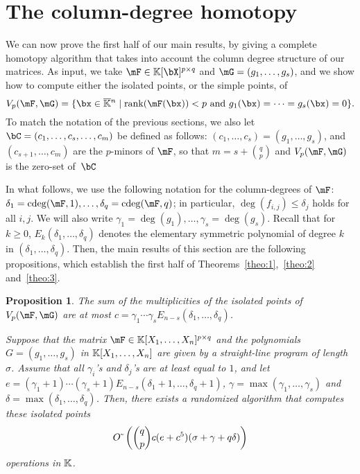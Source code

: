 \documentclass[12pt]{article}
\newtheorem{proposition}[definition]{Proposition}
\begin{document}
\section{The column-degree homotopy}\label{sec:columndegree}

We can now prove the first half of our main results, by giving a
complete homotopy algorithm that takes into account the column degree
structure of our matrices. As input, we take $\mF \in \K[\bX]^{p\times q}$ and $\mG=(g_1,\dots,g_s)$,
and we show how to compute either the isolated points, or
the simple points, of
$$\VpFG{p}{\mF}{\mG} = \{\bx \in \KKbar{}^n \mid
\mathrm{rank}(\mF({\bx})) < p \text{~and~}
g_1(\bx)=\cdots=g_s(\bx)=0\}.$$ 
To match the notation of the previous sections, we also let
$\bC=(c_1,\dots,c_{s},\dots,c_m)$ be defined as follows:
$(c_1,\dots,c_{s})=(g_1,\dots,g_s)$, and $(c_{s+1},\dots,c_{m})$ are
the $p$-minors of $\mF$, so that $m=s+{q \choose p}$ and
$\VpFG{p}{\mF}{\mG}$ is the zero-set of~$\bC$


In what follows, we use the following notation for the column-degrees
of $\mF$: $\delta_1=\cdeg(\mF,1),\dots,\delta_q=\cdeg(\mF,q)$; in
particular, $\deg(f_{i,j}) \leq \delta_j$ holds for all $i,j$.  We
will also write $\gamma_1=\deg(g_1),\dots,\gamma_s=\deg(g_s)$.  Recall
that for $k\geq 0$, $E_k(\delta_1,\dots,\delta_q)$ denotes the
elementary symmetric polynomial of degree $k$ in $(\delta_1, \ldots,
\delta_q)$. Then, the main results of this section are the following
propositions, which establish the first half of
Theorems~\ref{theo:1},~\ref{theo:2} and~\ref{theo:3}.

\begin{proposition}\label{prop:coldeg}
  The sum
  of the multiplicities of the isolated points of $\VpFG{p}{\mF}{\mG}$
  are at most
  $c=\gamma_1\cdots\gamma_sE_{n-s}(\delta_1, \ldots, \delta_q)$.

  Suppose that the matrix $\mF \in \KK[X_1,\dots,X_n]^{p \times q}$
  and the polynomials $G=(g_1,\dots,g_s)$ in $\mathbb{K}[X_1,\dots,X_n]$ are
  given by a straight-line program of length $\sigma$. 
  Assume that all $\gamma_i$'s and $\delta_j$'s are at least equal to
  $1$, and let
  $e=(\gamma_1+1)\cdots(\gamma_s+1) E_{n-s}(\delta_1+1, \ldots,
  \delta_q+1)$, $\gamma = \max(\gamma_1, \ldots, \gamma_s)$ and
  $\delta = \max(\delta_1, \ldots, \delta_q)$.
  Then, there exists a randomized algorithm that computes these isolated
  points
  $$
  {O}{\,\tilde{ }\,}\left ({q \choose p} c(e+c^5 )(\sigma +\gamma + q
    \delta)\right)
  $$
  operations in $\mathbb{K}$.
\end{proposition}
\end{document}
